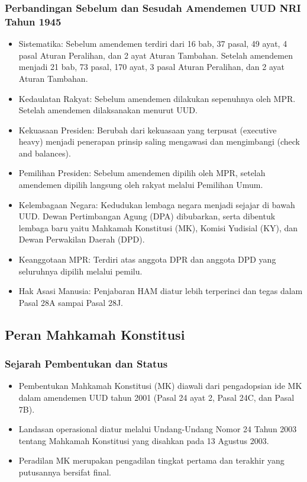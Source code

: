 \subsubsection{Perbandingan Sebelum dan Sesudah Amendemen UUD NRI Tahun 1945}
\begin{itemize}
\item Sistematika: Sebelum amendemen terdiri dari 16 bab, 37 pasal, 49 ayat, 4 pasal Aturan Peralihan, dan 2 ayat Aturan Tambahan. Setelah amendemen menjadi 21 bab, 73 pasal, 170 ayat, 3 pasal Aturan Peralihan, dan 2 ayat Aturan Tambahan.
\item Kedaulatan Rakyat: Sebelum amendemen dilakukan sepenuhnya oleh MPR. Setelah amendemen dilaksanakan menurut UUD.
\item Kekuasaan Presiden: Berubah dari kekuasaan yang terpusat (executive heavy) menjadi penerapan prinsip saling mengawasi dan mengimbangi (check and balances).
\item Pemilihan Presiden: Sebelum amendemen dipilih oleh MPR, setelah amendemen dipilih langsung oleh rakyat melalui Pemilihan Umum.
\item Kelembagaan Negara: Kedudukan lembaga negara menjadi sejajar di bawah UUD. Dewan Pertimbangan Agung (DPA) dibubarkan, serta dibentuk lembaga baru yaitu Mahkamah Konstitusi (MK), Komisi Yudisial (KY), dan Dewan Perwakilan Daerah (DPD).
\item Keanggotaan MPR: Terdiri atas anggota DPR dan anggota DPD yang seluruhnya dipilih melalui pemilu.
\item Hak Asasi Manusia: Penjabaran HAM diatur lebih terperinci dan tegas dalam Pasal 28A sampai Pasal 28J.
\end{itemize}

\subsection{Peran Mahkamah Konstitusi}

\subsubsection{Sejarah Pembentukan dan Status}
\begin{itemize}
\item Pembentukan Mahkamah Konstitusi (MK) diawali dari pengadopsian ide MK dalam amendemen UUD tahun 2001 (Pasal 24 ayat 2, Pasal 24C, dan Pasal 7B).
\item Landasan operasional diatur melalui Undang-Undang Nomor 24 Tahun 2003 tentang Mahkamah Konstitusi yang disahkan pada 13 Agustus 2003.
\item Peradilan MK merupakan pengadilan tingkat pertama dan terakhir yang putusannya bersifat final.
\end{itemize}

